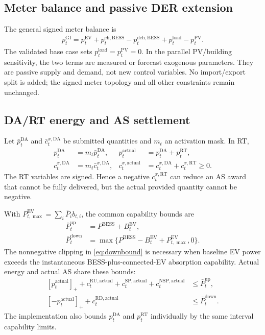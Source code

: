 \documentclass[final,5p,times]{elsarticle}
\newcommand{\EV}{\mathrm{EV}}
\newcommand{\BESS}{\mathrm{BESS}}
\newcommand{\DA}{\mathrm{DA}}
\newcommand{\RT}{\mathrm{RT}}
\newcommand{\GI}{\mathrm{GI}}
\newcommand{\PV}{\mathrm{PV}}
\newcommand{\RU}{\mathrm{RU}}
\newcommand{\RD}{\mathrm{RD}}
\newcommand{\SP}{\mathrm{SP}}
\newcommand{\NSP}{\mathrm{NSP}}
\newcommand{\ch}{\mathrm{ch}}
\newcommand{\dch}{\mathrm{dch}}
\newcommand{\actual}{\mathrm{actual}}
\newcommand{\load}{\mathrm{load}}
\newcommand{\pos}[1]{\left[#1\right]_{+}}
\begin{document}
\subsection{Meter balance and passive DER extension}
\label{sec:passive_der}
The general signed meter balance is
\begin{align}
p_t^{\GI}
=p_t^{\EV}+p_t^{\ch,\BESS}-p_t^{\dch,\BESS}
+p_t^{\load}-p_t^{\PV}. \label{eq:meter}
\end{align}
The validated base case sets $p_t^{\load}=p_t^{\PV}=0$. In the parallel
PV/building sensitivity, the two terms are measured or forecast exogenous
parameters. They are passive supply and demand, not new control variables. No
import/export split is added; the signed meter topology and all other
constraints remain unchanged.

\subsection{DA/RT energy and AS settlement}
Let $\bar p_t^{\DA}$ and $\bar c_t^{x,\DA}$ be submitted quantities and
$m_t$ an activation mask. In RT,
\begin{align}
p_t^{\DA}&=m_t\bar p_t^{\DA},&
p_t^{\actual}&=p_t^{\DA}+p_t^{\RT}, \label{eq:actual_energy}\\
c_t^{x,\DA}&=m_t\bar c_t^{x,\DA},&
c_t^{x,\actual}&=c_t^{x,\DA}+c_t^{x,\RT}\ge0. \label{eq:actual_as}
\end{align}
The RT variables are signed. Hence a negative $c_t^{x,\RT}$ can reduce an AS
award that cannot be fully delivered, but the actual provided quantity cannot
be negative.

With $P_{t,\max}^{\EV}=\sum_i\bar P_i b_{t,i}$, the common capability bounds are
\begin{align}
\bar P_t^{\mathrm{up}}&=P^{\BESS}+B_t^{\EV}, \label{eq:upbound}\\
\bar P_t^{\mathrm{down}}
&=\max\{P^{\BESS}-B_t^{\EV}+P_{t,\max}^{\EV},0\}. \label{eq:downbound}
\end{align}
The nonnegative clipping in \eqref{eq:downbound} is necessary when baseline EV
power exceeds the instantaneous BESS-plus-connected-EV absorption capability.
Actual energy and actual AS share these bounds:
\begin{align}
\pos{p_t^{\actual}}+
c_t^{\RU,\actual}+c_t^{\SP,\actual}+c_t^{\NSP,\actual}
&\le\bar P_t^{\mathrm{up}}, \label{eq:up_envelope}\\
\pos{-p_t^{\actual}}+c_t^{\RD,\actual}
&\le\bar P_t^{\mathrm{down}}. \label{eq:down_envelope}
\end{align}
The implementation also bounds $p_t^{\DA}$ and $p_t^{\RT}$ individually by the
same interval capability limits.
\end{document}
